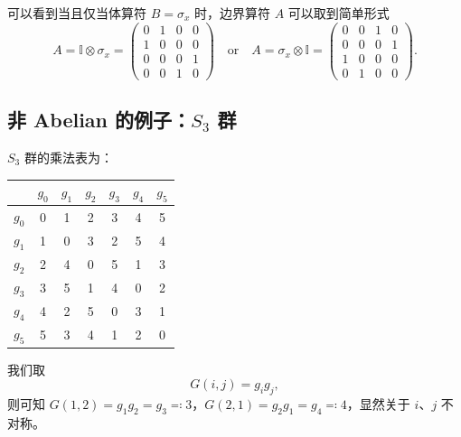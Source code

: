 可以看到当且仅当体算符 $B=\sigma_x$ 时，边界算符 $A$ 可以取到简单形式
\begin{equation}
  A = \mathbb{I} \otimes \sigma_x = \begin{pmatrix}
    0 & 1 & 0 & 0 \\
    1 & 0 & 0 & 0 \\
    0 & 0 & 0 & 1 \\
    0 & 0 & 1 & 0
  \end{pmatrix}
  \quad \text{or} \quad
  A = \sigma_x \otimes \mathbb{I} = \begin{pmatrix}
    0 & 0 & 1 & 0 \\
    0 & 0 & 0 & 1 \\
    1 & 0 & 0 & 0 \\
    0 & 1 & 0 & 0
  \end{pmatrix}.
\end{equation}

\subsection{非 Abelian 的例子：\texorpdfstring{$S_3$}{𝑆₃} 群}

$S_3$ 群的乘法表为：
\begin{center}
  \begin{tabular}{c|cccccc}
    & $g_0$ & $g_1$ & $g_2$ & $g_3$ & $g_4$ & $g_5$ \\
    \hline
    $g_0$ & 0 & 1 & 2 & 3 & 4 & 5 \\
    $g_1$ & 1 & 0 & 3 & 2 & 5 & 4 \\
    $g_2$ & 2 & 4 & 0 & 5 & 1 & 3 \\
    $g_3$ & 3 & 5 & 1 & 4 & 0 & 2 \\
    $g_4$ & 4 & 2 & 5 & 0 & 3 & 1 \\
    $g_5$ & 5 & 3 & 4 & 1 & 2 & 0 \\
  \end{tabular}
\end{center}
我们取
\begin{equation}
  G(i,j) = g_i g_j,
\end{equation}
则可知 $G(1,2)=g_1 g_2=g_3\eqcolon3$，$G(2,1)=g_2 g_1=g_4\eqcolon4$，显然关于 $i$、$j$ 不对称。

